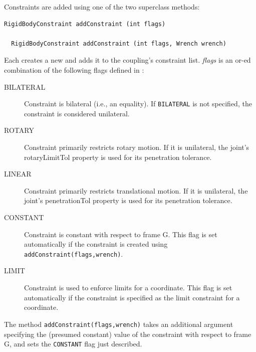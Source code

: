 Constraints are added using one of the two superclass methods:
%
\begin{lstlisting}[]
  RigidBodyConstraint addConstraint (int flags)

  RigidBodyConstraint addConstraint (int flags, Wrench wrench)
\end{lstlisting}
%
Each creates a new
and adds it to the coupling's constraint list.
{\it flags} is an or-ed combination of the following flags 
defined in
:
\begin{description}

\item[BILATERAL]\mbox{}

Constraint is bilateral (i.e., an equality). If {\tt BILATERAL}
is not specified, the constraint is considered unilateral.

\item[ROTARY]\mbox{}

Constraint primarily restricts rotary motion. If it is unilateral, the
joint's {\sf rotaryLimitTol} property is used for its penetration tolerance.

\item[LINEAR]\mbox{}

Constraint primarily restricts translational motion. If it is
unilateral, the joint's {\sf penetrationTol} property is used for its
penetration tolerance.

\item[CONSTANT]\mbox{}

Constraint is constant with respect to frame G. This flag is set
automatically if the constraint is created using {\tt
addConstraint(flags,wrench)}.

\item[LIMIT]\mbox{}

Constraint is used to enforce limits for a coordinate.  This flag is
set automatically if the constraint is specified as the limit
constraint for a coordinate.

\end{description}
%
The method {\tt addConstraint(flags,wrench)} takes an additional
 argument specifying the
(presumed constant) value of the constraint with respect to frame G,
and sets the {\tt CONSTANT} flag just described.  


